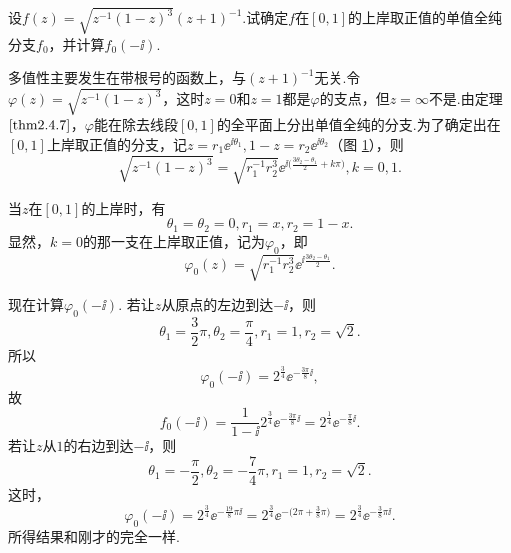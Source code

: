 \begin{example}\label{exam2.4.9}
设$f(z)=\sqrt{z^{-1}(1-z)^3}(z+1)^{-1}$.试确定$f$在$[0,1]$的上岸取正值的单值全纯分支$f_0$，并计算$f_0(-\ii)$.
\end{example}
\begin{solution}
多值性主要发生在带根号的函数上，与$(z+1)^{-1}$无关.令$\varphi(z)=\sqrt{z^{-1}(1-z)^3}$，这时$z=0$和$z=1$都是$\varphi$的支点，但$z=\infty$不是.由定理  $\ref{thm2.4.7}$，$\varphi$能在除去线段$[0,1]$的全平面上分出单值全纯的分支.为了确定出在$[0,1]$上岸取正值的分支，记$z=r_1\ee^{\ii\theta_1},1-z=r_2\ee^{\ii\theta_2}$（图 \ref{fig2.9}），则
\[\sqrt{z^{-1}(1-z)^3}=\sqrt{r_1^{-1}r_2^3}
\ee^{\ii\big(\frac{3\theta_2-\theta_1}2+k\pi\big)},k=0,1.\]
\begin{figure}[!ht]
\centering
{}
\caption{\label{fig2.9}}
\end{figure}
当$z$在$[0,1]$的上岸时，有
\[\theta_1=\theta_2=0,r_1=x,r_2=1-x.\]
显然，$k=0$的那一支在上岸取正值，记为$\varphi_0$，即
\[\varphi_0(z)=\sqrt{r_1^{-1}r_2^3}
\ee^{\ii\frac{3\theta_2-\theta_1}2}.\]

现在计算$\varphi_0(-\ii)$. 若让$z$从原点的左边到达$-\ii$，则
\[\theta_1=\frac32\pi,\theta_2=\frac\pi4,r_1=1,r_2=\sqrt2.\]
所以
\[\varphi_0(-\ii)=2^{\frac34}\ee^{-\frac{3\pi}8\ii},\]
故
\[f_0(-\ii)=\frac1{1-\ii}2^{\frac34}\ee^{-\frac{3\pi}8\ii}=2^{\frac14}\ee^{
-\frac\pi8\ii}.\]
若让$z$从$1$的右边到达$-\ii$，则
\[\theta_1=-\frac\pi2,\theta_2=-\frac74\pi,r_1=1,r_2=\sqrt2.\]
这时，
\[\varphi_0(-\ii)=2^{\frac34}\ee^{-\frac{19}8\pi\ii}=2^{\frac34}\ee^{-
\big(2\pi+\frac38\pi\big)}=2^{\frac34}\ee^{-\frac38\pi\ii}.\]
所得结果和刚才的完全一样.
\end{solution}
